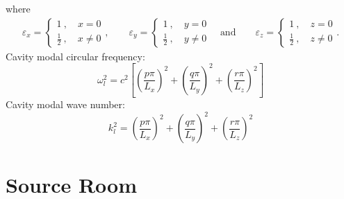 \documentclass[a4paper,UTF8]{ctexart}
\begin{document}
	where
	\begin{gather*}
	\varepsilon_x
	=\begin{cases}
	1\ ,\quad x=0\\
	\frac 12\ ,\quad x\neq 0
	\end{cases},\qquad
	\varepsilon_y
	=\begin{cases}
	1\ ,\quad y=0\\
	\frac 12\ ,\quad y\neq 0
	\end{cases}\quad \text{and}\quad\quad
	\varepsilon_z
	=\begin{cases}
	1\ ,\quad z=0\\
	\frac 12\ ,\quad z\neq 0
	\end{cases}.
	\end{gather*}
	Cavity modal circular frequency:
	\begin{equation}
	\label{eq:cavityModalCircularFrequency}
	\omega_l^2
	= c^2\left[
		\left(\frac{p\pi}{L_x}\right)^2 + 
		\left(\frac{q\pi}{L_y}\right)^2 + 
		\left(\frac{r\pi}{L_z}\right)^2  \right]
	\end{equation}
	Cavity modal wave number:
	\begin{equation}
	\label{eq:cavityModalWaveNumber}
	k_l^2 = \left(\frac{p\pi}{L_x}\right)^2 +
			\left(\frac{q\pi}{L_y}\right)^2 +
			\left(\frac{r\pi}{L_z}\right)^2
	\end{equation}
	
	
	\section{Source Room}
	
\end{document}
